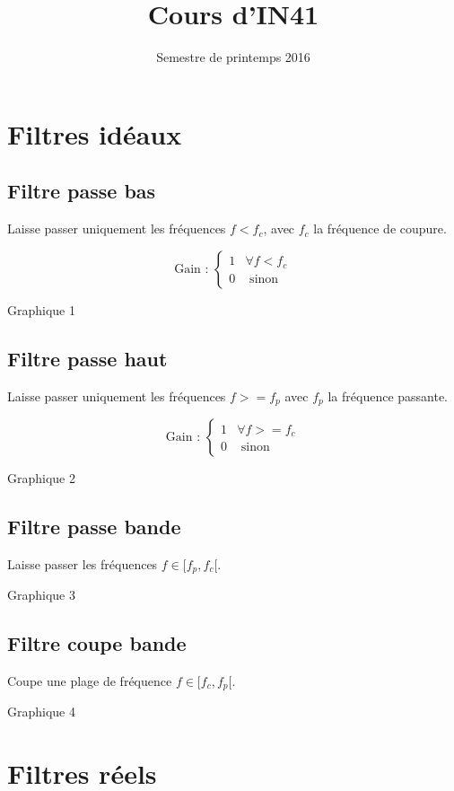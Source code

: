 \documentclass[a4paper,12pt]{article}
\title{Cours d'IN41}{Chapitre 6 -- Filtrage analogique}
\author{}
\date{Semestre de printemps 2016}
\begin{document}
\maketitlepage

\tableofcontents
\pagebreak

\section{Filtres idéaux}

\subsection{Filtre passe bas}

Laisse passer uniquement les fréquences $f < f_c$, avec $f_c$ la fréquence de coupure.

\[ \text{Gain : } \begin{cases}
    1 & \forall f < f_c \\
    0 & \text{ sinon}
\end{cases} \]

{\Large Graphique 1}

\subsection{Filtre passe haut}

Laisse passer uniquement les fréquences $f >= f_p$ avec $f_p$ la fréquence passante.

\[ \text{Gain : } \begin{cases}
    1 & \forall f >= f_c \\
    0 & \text{ sinon}
\end{cases} \]

{\Large Graphique 2}

\subsection{Filtre passe bande}

Laisse passer les fréquences $f \in [ f_p , f_c [$.

{\Large Graphique 3}

\subsection{Filtre coupe bande}

Coupe une plage de fréquence $f \in [ f_c , f_p [$.

{\Large Graphique 4}

\section{Filtres réels}
\end{document}

